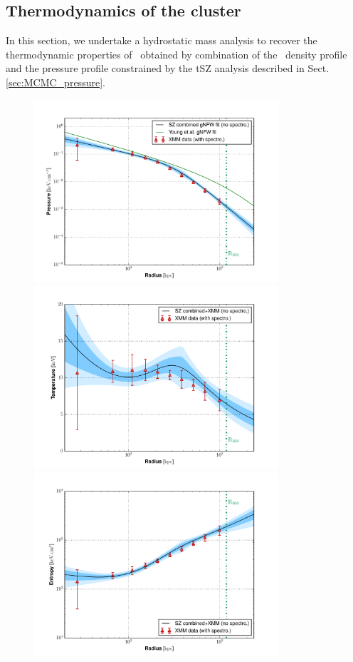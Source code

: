 \documentclass[traditabstract]{aa}
\begin{document}
\subsection{Thermodynamics of the cluster}\label{sec:comparison_X_tSZ}

In this section, we undertake a hydrostatic mass analysis to recover the thermodynamic properties of \psz\ obtained by combination of the \xmm\ density profile and the pressure profile constrained by the tSZ analysis described in Sect. \ref{sec:MCMC_pressure}.\\
\begin{figure}[h!]
\centering
\includegraphics[height=6.8cm]{P_profile_gNFW.pdf}
\includegraphics[height=6.8cm]{T_profile.pdf}
\includegraphics[height=6.8cm]{K_profile.pdf}

\end{figure}
\end{document}
